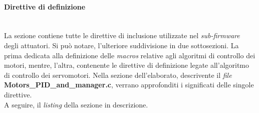 \paragraph{Direttive di definizione}\mbox{}\\
La sezione contiene tutte le direttive di inclusione utilizzate nel \textit{sub-firmware} degli attuatori. Si può notare, l'ulteriore suddivisione in due sottosezioni. La prima dedicata alla definizione delle \textit{macros} relative agli algoritmi di controllo dei motori, mentre, l'altra, contenente le direttive di definizione legate all'algoritmo di controllo dei servomotori.
Nella sezione dell'elaborato, descrivente il \textit{file} \textbf{Motors\_PID\_and\_manager.c}, verrano approfonditi i significati delle singole direttive.\\
A seguire, il \textit{listing} della sezione in descrizione.\\


